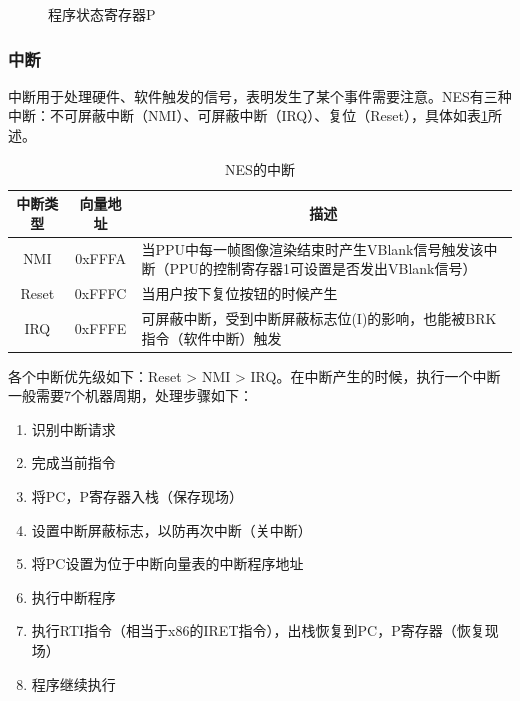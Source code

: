 \documentclass[a4paper]{ltxdoc}
\begin{document}
{\begin{figure}[h]
\centering
{}
\caption{程序状态寄存器P}
\label{fig:processor_status}
\end{figure}

\subsubsection{中断}
中断用于处理硬件、软件触发的信号，表明发生了某个事件需要注意。NES有三种中断：不可屏蔽中断（NMI）、可屏蔽中断（IRQ）、复位（Reset），具体如表\ref{tab:interrupts}所述。

\begin{table}[h]
\centering
\caption{NES的中断}
\label{tab:interrupts}
\begin{tabularx}{\textwidth}{|c|c|X|}
\hline
\rowcolor[HTML]{8DCDFF}
中断类型  & 向量地址   & \multicolumn{1}{c|}{\cellcolor[HTML]{8DCDFF}描述}           \\ \hline
NMI   & 0xFFFA & 当PPU中每一帧图像渲染结束时产生VBlank信号触发该中断（PPU的控制寄存器1可设置是否发出VBlank信号） \\ \hline
Reset & 0xFFFC & 当用户按下复位按钮的时候产生                                            \\ \hline
IRQ   & 0xFFFE & 可屏蔽中断，受到中断屏蔽标志位(I)的影响，也能被BRK指令（软件中断）触发                    \\ \hline
\end{tabularx}
\end{table}

各个中断优先级如下：Reset > NMI > IRQ。在中断产生的时候，执行一个中断一般需要7个机器周期，处理步骤如下：
\begin{enumerate}
\item 识别中断请求
\item 完成当前指令
\item 将PC，P寄存器入栈（保存现场）
\item 设置中断屏蔽标志，以防再次中断（关中断）
\item 将PC设置为位于中断向量表的中断程序地址
\item 执行中断程序
\item 执行RTI指令（相当于x86的IRET指令），出栈恢复到PC，P寄存器（恢复现场）
\item 程序继续执行
\end{enumerate}

}
\end{document}
